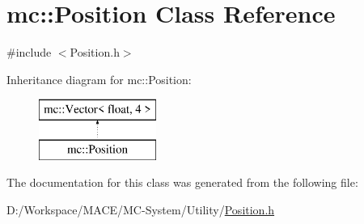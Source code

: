 \hypertarget{classmc_1_1_position}{}\section{mc\+:\+:Position Class Reference}
\label{classmc_1_1_position}


{\ttfamily \#include $<$Position.\+h$>$}

Inheritance diagram for mc\+:\+:Position\+:\begin{figure}[H]
\begin{center}
\leavevmode
\includegraphics[height=2.000000cm]{classmc_1_1_position}
\end{center}
\end{figure}


The documentation for this class was generated from the following file\+:\begin{DoxyCompactItemize}
\item 
D\+:/\+Workspace/\+M\+A\+C\+E/\+M\+C-\/\+System/\+Utility/\hyperlink{_position_8h}{Position.\+h}\end{DoxyCompactItemize}
